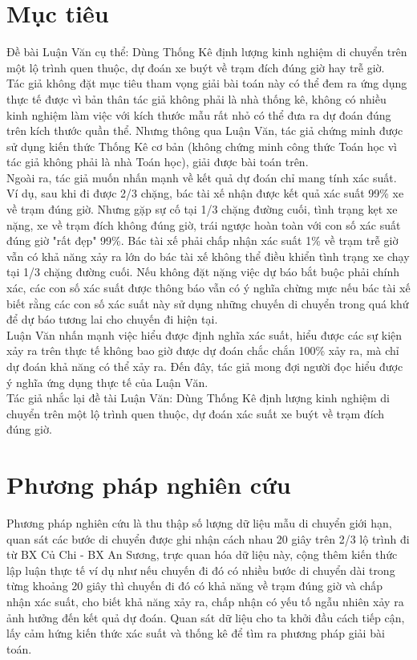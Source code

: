 \documentclass[a4paper, 13pt]{report}
\begin{document}
\section{Mục tiêu}
Đề bài Luận Văn cụ thể: Dùng Thống Kê định lượng kinh nghiệm di chuyển trên một lộ trình quen thuộc, dự đoán xe buýt về trạm đích đúng giờ hay trễ giờ.\\
Tác giả không đặt mục tiêu tham vọng giải bài toán này có thể đem ra ứng dụng thực tế được vì bản thân tác giả không phải là nhà thống kê, không có nhiều kinh nghiệm làm việc với kích thước mẫu rất nhỏ có thể đưa ra dự đoán đúng trên kích thước quần thể. Nhưng thông qua Luận Văn, tác giả chứng minh được sử dụng kiến thức Thống Kê cơ bản (không chứng minh công thức Toán học vì tác giả không phải là nhà Toán học), giải được bài toán trên.\\
Ngoài ra, tác giả muốn nhấn mạnh về kết quả dự đoán chỉ mang tính xác suất. Ví dụ, sau khi đi được 2/3 chặng, bác tài xế nhận được kết quả xác suất 99\% xe về trạm đúng giờ. Nhưng gặp sự cố tại 1/3 chặng đường cuối, tình trạng kẹt xe nặng, xe về trạm đích không đúng giờ, trái ngược hoàn toàn với con số xác suất đúng giờ "rất đẹp" 99\%. Bác tài xế phải chấp nhận xác suất 1\% về trạm trễ giờ vẫn có khả năng xảy ra lớn do bác tài xế không thể điều khiển tình trạng xe chạy tại 1/3 chặng đường cuối. Nếu không đặt nặng việc dự báo bắt buộc phải chính xác, các con số xác suất được thông báo vẫn có ý nghĩa chừng mực nếu bác tài xế biết rằng các con số xác suất này sử dụng những chuyến di chuyển trong quá khứ để dự báo tương lai cho chuyến đi hiện tại.\\
Luận Văn nhấn mạnh việc hiểu được định nghĩa xác suất, hiểu được các sự kiện xảy ra trên thực tế không bao giờ được dự đoán chắc chắn 100\% xảy ra, mà chỉ dự đoán khả năng có thể xảy ra. Đến đây, tác giả mong đợi người đọc hiểu được ý nghĩa ứng dụng thực tế của Luận Văn.\\
Tác giả nhắc lại đề tài Luận Văn: Dùng Thống Kê định lượng kinh nghiệm di chuyển trên một lộ trình quen thuộc, dự đoán xác suất xe buýt về trạm đích đúng giờ.
\section{Phương pháp nghiên cứu}
Phương pháp nghiên cứu là thu thập số lượng dữ liệu mẫu di chuyển giới hạn, quan sát các bước di chuyển được ghi nhận cách nhau 20 giây trên 2/3 lộ trình đi từ BX Củ Chi - BX An Sương, trực quan hóa dữ liệu này, cộng thêm kiến thức lập luận thực tế ví dụ như nếu chuyến đi đó có nhiều bước di chuyển dài trong từng khoảng 20 giây thì chuyến đi đó có khả năng về trạm đúng giờ và chấp nhận xác suất, cho biết khả năng xảy ra, chấp nhận có yếu tố ngẫu nhiên xảy ra ảnh hưởng đến kết quả dự đoán. Quan sát dữ liệu cho ta khởi đầu cách tiếp cận, lấy cảm hứng kiến thức xác suất và thống kê để tìm ra phương pháp giải bài toán.  
\end{document}
